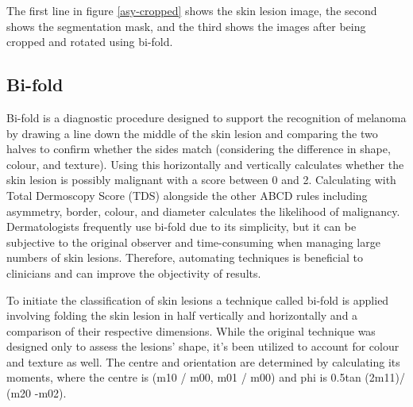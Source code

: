 The first line in figure \ref{asy-cropped} shows the skin lesion image, the second shows the segmentation mask, and the third shows the images after being cropped and rotated using bi-fold.

\subsection{Bi-fold}
Bi-fold is a diagnostic procedure designed to support the recognition of melanoma by drawing a line down the middle of the skin lesion and comparing the two halves to confirm whether the sides match (considering the difference in shape, colour, and texture). Using this horizontally and vertically calculates whether the skin lesion is possibly malignant with a score between 0 and 2. Calculating with Total Dermoscopy Score (TDS) alongside the other ABCD rules including asymmetry, border, colour, and diameter calculates the likelihood of malignancy. Dermatologists frequently use bi-fold due to its simplicity, but it can be subjective to the original observer and time-consuming when managing large numbers of skin lesions. Therefore, automating techniques is beneficial to clinicians and can improve the objectivity of results.

To initiate the classification of skin lesions a technique called bi-fold is applied involving folding the skin lesion in half vertically and horizontally and a comparison of their respective dimensions. While the original technique was designed only to assess the lesions' shape, it's been utilized to account for colour and texture as well. The centre and orientation are determined by calculating its moments, where the centre is (m10 / m00, m01 / m00) and phi is 0.5tan (2m11)/ (m20 -m02).

